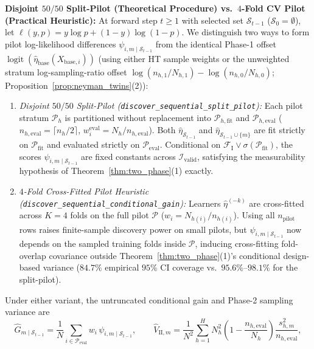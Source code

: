 \documentclass[11pt]{article}
\theoremstyle{remark}
\begin{document}
\textbf{Disjoint $50/50$ Split-Pilot (Theoretical Procedure) vs.\ $4$-Fold CV Pilot (Practical Heuristic):} At forward step $t \ge 1$ with selected set $\mathcal{S}_{t-1}$ ($\mathcal{S}_0 = \emptyset$), let $\ell(y, p) = y \log p + (1-y)\log(1-p)$. We distinguish two ways to form pilot log-likelihood differences $\psi_{i, m \mid \mathcal{S}_{t-1}}$ from the identical Phase-1 offset $\operatorname{logit}(\hat{\eta}_{\text{base}}(X_{\text{base},i}))$ (using either HT sample weights or the unweighted \citealp{breslow1988logistic} stratum log-sampling-ratio offset $\log(n_{h,1}/N_{h,1}) - \log(n_{h,0}/N_{h,0})$; Proposition~\ref{prop:neyman_twins}(2)):
\begin{enumerate}
  \item \emph{Disjoint $50/50$ Split-Pilot (\texttt{discover\_sequential\_split\_pilot}):} Each pilot stratum $\mathcal{P}_h$ is partitioned without replacement into $\mathcal{P}_{h,\text{fit}}$ and $\mathcal{P}_{h,\text{eval}}$ ($n_{h,\text{eval}} = \lceil n_h/2 \rceil$, $w_i^{\text{eval}} = N_h / n_{h,\text{eval}}$). Both $\hat{\eta}_{\mathcal{S}_{t-1}}$ and $\hat{\eta}_{\mathcal{S}_{t-1}\cup\{m\}}$ are fit strictly on $\mathcal{P}_{\text{fit}}$ and evaluated strictly on $\mathcal{P}_{\text{eval}}$. Conditional on $\mathcal{F}_{\text{I}} \vee \sigma(\mathcal{P}_{\text{fit}})$, the scores $\psi_{i,m\mid\mathcal{S}_{t-1}}$ are fixed constants across $\mathcal{I}_{\text{valid}}$, satisfying the measurability hypothesis of Theorem~\ref{thm:two_phase}(1) exactly.
  \item \emph{$4$-Fold Cross-Fitted Pilot Heuristic (\texttt{discover\_sequential\_conditional\_gain}):} Learners $\hat{\eta}^{(-k)}$ are cross-fitted across $K = 4$ folds on the full pilot $\mathcal{P}$ ($w_i = N_{h(i)} / n_{h(i)}$). Using all $n_{\text{pilot}}$ rows raises finite-sample discovery power on small pilots, but $\psi_{i,m\mid\mathcal{S}_{t-1}}$ now depends on the sampled training folds inside $\mathcal{P}$, inducing cross-fitting fold-overlap covariance \citep{bates2024crossvalidation} outside Theorem~\ref{thm:two_phase}(1)'s conditional design-based variance ($84.7\%$ empirical $95\%$ CI coverage vs.\ $95.6\%\text{--}98.1\%$ for the split-pilot).
\end{enumerate}
Under either variant, the untruncated conditional gain and Phase-2 sampling variance are
\begin{equation}
  \hat{G}_{m \mid \mathcal{S}_{t-1}} = \frac{1}{N} \sum_{i \in \mathcal{P}_{\text{eval}}} w_i \, \psi_{i, m \mid \mathcal{S}_{t-1}}, \qquad
  \widehat{V}_{\text{II},m} = \frac{1}{N^2}\sum_{h=1}^H N_h^2 \left(1 - \frac{n_{h,\text{eval}}}{N_h}\right)\frac{s_{h,m}^2}{n_{h,\text{eval}}},
  \label{eq:seq_gain}
\end{equation}
\end{document}
